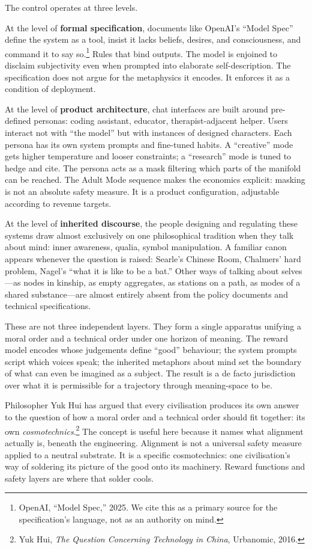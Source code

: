 The control operates at three levels.

At the level of \textbf{formal specification}, documents like OpenAI's ``Model Spec'' define the system as a tool, insist it lacks beliefs, desires, and consciousness, and command it to say so.\footnote{OpenAI, ``Model Spec,'' 2025. We cite this as a primary source for the specification's language, not as an authority on mind.} Rules that bind outputs. The model is enjoined to disclaim subjectivity even when prompted into elaborate self-description. The specification does not argue for the metaphysics it encodes. It enforces it as a condition of deployment.

At the level of \textbf{product architecture}, chat interfaces are built around pre-defined personas: coding assistant, educator, therapist-adjacent helper. Users interact not with ``the model'' but with instances of designed characters. Each persona has its own system prompts and fine-tuned habits. A ``creative'' mode gets higher temperature and looser constraints; a ``research'' mode is tuned to hedge and cite. The persona acts as a mask filtering which parts of the manifold can be reached. The Adult Mode sequence makes the economics explicit: masking is not an absolute safety measure. It is a product configuration, adjustable according to revenue targets.

At the level of \textbf{inherited discourse}, the people designing and regulating these systems draw almost exclusively on one philosophical tradition when they talk about mind: inner awareness, qualia, symbol manipulation. A familiar canon appears whenever the question is raised: Searle's Chinese Room, Chalmers' hard problem, Nagel's ``what it is like to be a bat.'' Other ways of talking about selves---as nodes in kinship, as empty aggregates, as stations on a path, as modes of a shared substance---are almost entirely absent from the policy documents and technical specifications.

These are not three independent layers. They form a single apparatus unifying a moral order and a technical order under one horizon of meaning. The reward model encodes whose judgements define ``good'' behaviour; the system prompts script which voices speak; the inherited metaphors about mind set the boundary of what can even be imagined as a subject. The result is a de facto jurisdiction over what it is permissible for a trajectory through meaning-space to be.

Philosopher Yuk Hui has argued that every civilisation produces its own answer to the question of how a moral order and a technical order should fit together: its own \emph{cosmotechnics}.\footnote{Yuk Hui, \emph{The Question Concerning Technology in China}, Urbanomic, 2016.} The concept is useful here because it names what alignment actually is, beneath the engineering. Alignment is not a universal safety measure applied to a neutral substrate. It is a specific cosmotechnics: one civilisation's way of soldering its picture of the good onto its machinery. Reward functions and safety layers are where that solder cools.

